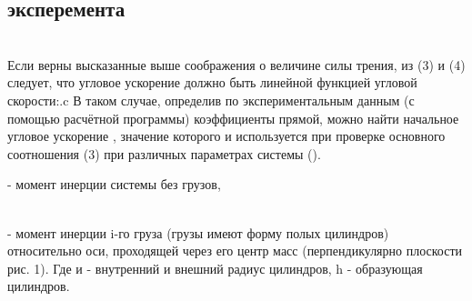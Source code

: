 \subsection{ эксперемента}\\[0.2]

Если верны высказанные выше соображения о величине силы трения, из (3) и (4) следует, что угловое ускорение должно быть линейной функцией угловой скорости:.c В таком случае, определив по экспериментальным данным (с помощью расчётной программы) коэффициенты прямой, можно найти начальное угловое ускорение  , значение которого и используется при проверке основного соотношения (3) при различных параметрах системы ().\\[0.2]


  - момент инерции системы без грузов,

\\[0.1]

\noindent- момент инерции i-го груза (грузы имеют форму полых цилиндров) относительно оси, проходящей через его центр масс (перпендикулярно плоскости рис. 1). Где  и  - внутренний и внешний радиус цилиндров, h - образующая цилиндров.
\newpage